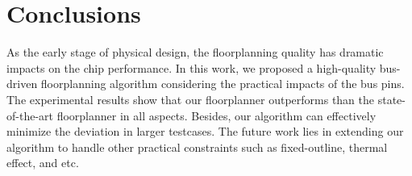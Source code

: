 \chapter{Conclusions}
\label{chap::CONCLUSIONS}

\baselineskip=26pt

\hspace{5mm}As the early stage of
physical design, the floorplanning quality has dramatic impacts on
the chip performance. In this work, we proposed a high-quality
bus-driven floorplanning algorithm considering the practical
impacts of the bus pins. The experimental results show that our
floorplanner outperforms than the state-of-the-art floorplanner
\cite{Ma08} in all aspects. Besides, our algorithm can effectively
minimize the deviation in larger testcases.
The future work lies in extending our
algorithm to handle other practical constraints such as
fixed-outline, thermal effect, and etc.
